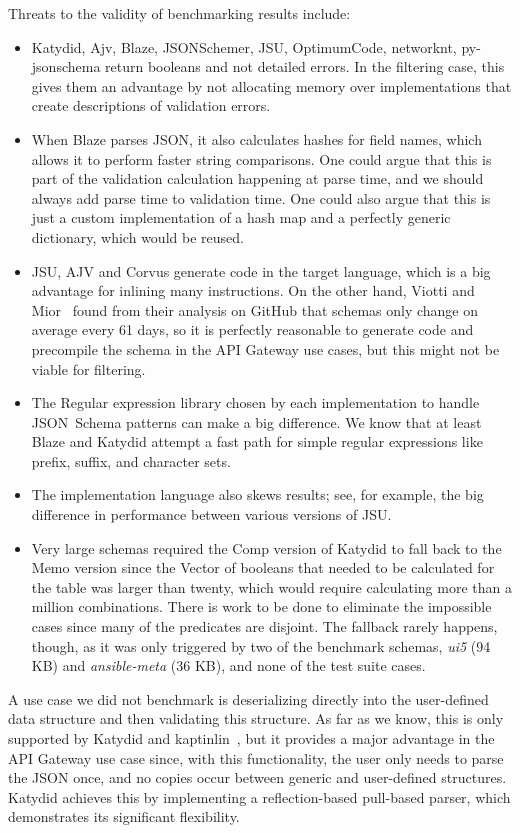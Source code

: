 \documentclass[runningheads]{llncs}
\newcommand{\leave}{\link{leave}{def leave}}
\newcommand{\JSONSchema}{%
  JSON~Schema\xspace%
}
\newcommand{\GitHub}{%
  GitHub\xspace%
}
\newcommand{\JSON}{\ac{JSON}\xspace}
\begin{document}
Threats to the validity of benchmarking results include:
\begin{itemize}
\item Katydid, Ajv, Blaze, JSONSchemer, JSU, OptimumCode, networknt, py-jsonschema return booleans and not detailed errors. In the filtering case, this gives them an advantage by not allocating memory over implementations that create descriptions of validation errors.
\item When Blaze parses \JSON, it also calculates hashes for field names, which allows it to perform faster string comparisons. One could argue that this is part of the validation calculation happening at parse time, and we should always add parse time to validation time. One could also argue that this is just a custom implementation of a hash map and a perfectly generic dictionary, which would be reused.
\item JSU, AJV and Corvus generate code in the target language, which is a big advantage for inlining many instructions. On the other hand, Viotti and Mior~\cite{blaze} found from their analysis on \GitHub that schemas only change on average every 61 days, so it is perfectly reasonable to generate code and precompile the schema in the API Gateway use cases, but this might not be viable for filtering.
\item The Regular expression library chosen by each implementation to handle \JSONSchema patterns can make a big difference. We know that at least Blaze and Katydid attempt a fast path for simple regular expressions like prefix, suffix, and character sets.
\item The implementation language also skews results; see, for example, the big difference in performance between various versions of JSU.
\item Very large schemas required the Comp version of Katydid to fall back to the Memo version since the Vector of booleans that needed to be calculated for the \leave table was larger than twenty, which would require calculating more than a million combinations. There is work to be done to eliminate the impossible cases since many of the predicates are disjoint. The fallback rarely happens, though, as it was only triggered by two of the benchmark schemas, \textit{ui5} (94 KB) and \textit{ansible-meta} (36 KB), and none of the test suite cases.
\end{itemize}

A use case we did not benchmark is deserializing directly into the user-defined data structure and then validating this structure.
As far as we know, this is only supported by Katydid and kaptinlin~\cite{jsonschema_impl_go-kaptinlin}, but it provides a major advantage in the API Gateway use case since, with this functionality, the user only needs to parse the \JSON once, and no copies occur between generic and user-defined structures.
Katydid achieves this by implementing a reflection-based pull-based parser, which demonstrates its significant flexibility.
\end{document}
